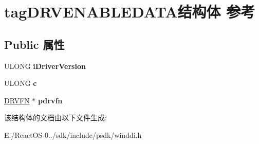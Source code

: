 \hypertarget{structtag_d_r_v_e_n_a_b_l_e_d_a_t_a}{}\section{tag\+D\+R\+V\+E\+N\+A\+B\+L\+E\+D\+A\+T\+A结构体 参考}
\label{structtag_d_r_v_e_n_a_b_l_e_d_a_t_a}
\subsection*{Public 属性}
\begin{DoxyCompactItemize}
\item 
\mbox{\label{structtag_d_r_v_e_n_a_b_l_e_d_a_t_a_aefd1d88443166b78dd9cd9c4efe741d4}} 
U\+L\+O\+NG {\bfseries i\+Driver\+Version}
\item 
\mbox{\label{structtag_d_r_v_e_n_a_b_l_e_d_a_t_a_acd8cf9f12c47c33f8c93b797b5b8caf1}} 
U\+L\+O\+NG {\bfseries c}
\item 
\mbox{\label{structtag_d_r_v_e_n_a_b_l_e_d_a_t_a_af8540457255d9ef4bf94a1e1da7ef8db}} 
\hyperlink{struct___d_r_v_f_n}{D\+R\+V\+FN} $\ast$ {\bfseries pdrvfn}
\end{DoxyCompactItemize}


该结构体的文档由以下文件生成\+:\begin{DoxyCompactItemize}
\item 
E\+:/\+React\+O\+S-\/0../sdk/include/psdk/winddi.\+h\end{DoxyCompactItemize}
